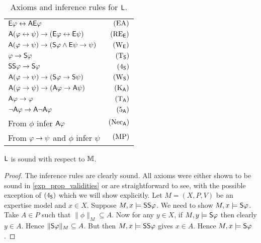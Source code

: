 \begin{table}
    \centering
    \caption{Axioms and inference rules for $\sL$.}
    \begin{tabular}{lr}
        \toprule
         $\E\phi \liff \A\E\phi$
             & $\EA$ \\
         $\A(\phi \liff \psi) \limplies (\E\phi \liff \E\psi)$
             & $\reE$ \\
         $\A(\phi \limplies \psi) \limplies (\S\phi \land \E\psi \limplies \psi)$
             & $\weakeningE$ \\
         \midrule
         $\phi \limplies \S\phi$
             & $\Tsoundness$ \\
         $\S\S\phi \limplies \S\phi$
             & $\foursoundness$ \\
         $\A(\phi \limplies \psi) \limplies (\S\phi \limplies \S\psi)$
             & $\weakeningS$ \\
         \midrule
         $\A(\phi \limplies \psi) \limplies (\A\phi \limplies \A\psi)$
             & $\Kuniv$ \\
         $\A\phi \limplies \phi$
             & $\Tuniv$ \\
         $\neg\A\phi \limplies \A\neg\A\phi$
             & $\fiveuniv$ \\
         \midrule
         From $\phi$ infer $\A\phi$
             & $\necuniv$ \\
         From $\phi \limplies \psi$ and $\phi$ infer $\psi$
             & $\modpon$ \\
        \bottomrule
    \end{tabular}
    \label{exp_tab_axioms_general_case}
\end{table}

\begin{lemma}
\label{exp_lemma_soundness_m}
    $\sL$ is sound with respect to $\M$.
\end{lemma}

\begin{proof}
    The inference rules are clearly sound. All axioms were either shown to be
    sound in \cref{exp_prop_validities} or are straightforward to see, with the
    possible exception of $\foursoundness$ which we will show explicitly. Let
    $M = (X, P, V)$ be an expertise model and $x \in X$. Suppose $M, x \models
    \S\S\phi$. We need to show $M, x \models \S\phi$. Take $A \in P$ such that
    $\|\phi\|_M \subseteq A$. Now for any $y \in X$, if $M, y \models \S\phi$
    then clearly $y \in A$. Hence $\|\S\phi\|_M \subseteq A$. But then $M, x
    \models \S\S\phi$ gives $x \in A$. Hence $M, x \models \S\phi$.
\end{proof}

